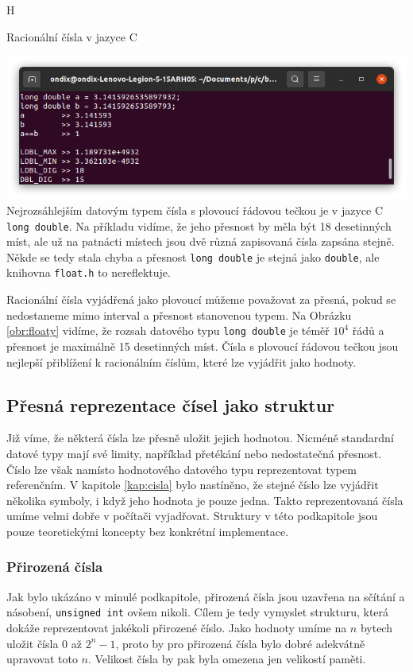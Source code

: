 \begin{myfigure}{H}
\caption{Racionální čísla v jazyce C}
\includegraphics[width=\linewidth]{./graphics/floaty.png}\label{obr:floaty}
Nejrozsáhlejším datovým typem čísla s plovoucí řádovou tečkou je v jazyce C \texttt{long double}. Na příkladu vidíme, že jeho přesnost by měla být 18 desetinných míst, ale už na patnácti místech jsou dvě různá zapisovaná čísla zapsána stejně. Někde se tedy stala chyba a přesnost \texttt{long double} je stejná jako \texttt{double}, ale knihovna \texttt{float.h} to nereflektuje.
\end{myfigure}

Racionální čísla vyjádřená jako plovoucí můžeme považovat za přesná, pokud se nedostaneme mimo interval a přesnost stanovenou typem. Na Obrázku \ref{obr:floaty} vidíme, že rozsah datového typu \texttt{long double} je téměř $10^4$ řádů a přesnost je maximálně 15 desetinných míst. Čísla s plovoucí řádovou tečkou jsou nejlepší přiblížení k racionálním číslům, které lze vyjádřit jako hodnoty.

\subsection{Přesná reprezentace čísel jako struktur}
Již víme, že některá čísla lze přesně uložit jejich hodnotou. Nicméně standardní datové typy mají své limity, například přetékání nebo nedostatečná přesnost. Číslo lze však namísto hodnotového datového typu reprezentovat typem referenčním. V kapitole \ref{kap:cisla} bylo nastíněno, že stejné číslo lze vyjádřit několika symboly, i když jeho hodnota je pouze jedna. Takto reprezentovaná čísla umíme velmi dobře v počítači vyjadřovat. Struktury v této podkapitole jsou pouze teoretickými koncepty bez konkrétní implementace.

\subsubsection{Přirozená čísla}
Jak bylo ukázáno v minulé podkapitole, přirozená čísla jsou uzavřena na sčítání a násobení, \texttt{unsigned int} ovšem nikoli. Cílem je tedy vymyslet strukturu, která dokáže reprezentovat jakékoli přirozené číslo. Jako hodnoty umíme na $n$ bytech uložit čísla $0$ až $2^n-1$, proto by pro přirozená čísla bylo dobré adekvátně upravovat toto $n$. Velikost čísla by pak byla omezena jen velikostí paměti.

